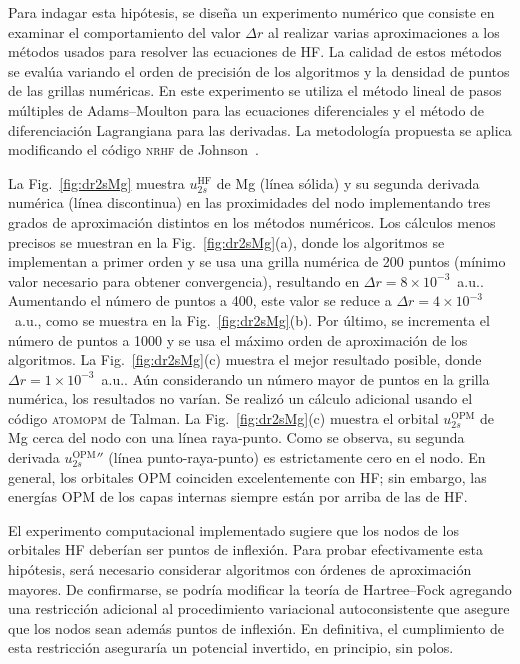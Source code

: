 Para indagar esta hipótesis, se diseña un experimento numérico que 
consiste en examinar el comportamiento del valor $\Delta r$ al realizar 
varias aproximaciones a los métodos usados para resolver las 
ecuaciones de HF. La calidad de estos métodos se evalúa variando el 
orden de precisión de los algoritmos y la densidad de puntos de las 
grillas numéricas. En este experimento se utiliza el método lineal de 
pasos múltiples de Adams--Moulton para las ecuaciones diferenciales y el 
método de diferenciación Lagrangiana para las derivadas. La metodología 
propuesta se aplica modificando el código \textsc{nrhf} de 
Johnson~\cite{Johnson:07}.

La Fig.~\ref{fig:dr2sMg} muestra $u_{2s}^{\mathrm{HF}}$ de Mg (línea 
sólida) y su segunda derivada numérica (línea discontinua) en las 
proximidades del nodo implementando tres grados de aproximación 
distintos en los métodos numéricos. Los cálculos menos precisos 
se muestran en la Fig.~\ref{fig:dr2sMg}(a), donde los algoritmos se 
implementan a primer orden y se usa una grilla numérica de 200 puntos 
(mínimo valor necesario para obtener convergencia), resultando en 
$\Delta r=8\times 10^{-3}$~a.u.. Aumentando el número de puntos a 400, 
este valor se reduce a $\Delta r=4\times 10^{-3}$~a.u., como se muestra 
en la Fig.~\ref{fig:dr2sMg}(b). Por último, se incrementa el número de 
puntos a 1000 y se usa el máximo orden de aproximación de los 
algoritmos. La Fig.~\ref{fig:dr2sMg}(c) muestra el mejor resultado 
posible, donde $\Delta r=1\times 10^{-3}$~a.u.. Aún considerando un 
número mayor de puntos en la grilla numérica, los resultados no varían. 
Se realizó un cálculo adicional usando el código \textsc{atomopm} de 
Talman. La Fig.~\ref{fig:dr2sMg}(c) muestra el orbital 
$u_{2s}^{\mathrm{OPM}}$ de Mg cerca del nodo con una línea raya-punto. 
Como se observa, su segunda derivada $u_{2s}^{\mathrm{OPM}}''$ (línea 
punto-raya-punto) es estrictamente cero en el nodo. En general, los 
orbitales OPM coinciden excelentemente con HF; sin embargo, las energías
OPM de los capas internas siempre están por arriba de las de HF.

El experimento computacional implementado sugiere que los nodos de los 
orbitales HF deberían ser puntos de inflexión. Para probar efectivamente 
esta hipótesis, será necesario considerar algoritmos con órdenes de 
aproximación mayores. De confirmarse, se podría modificar la teoría de 
Hartree--Fock agregando una restricción adicional al procedimiento 
variacional autoconsistente que asegure que los nodos sean además puntos 
de inflexión. En definitiva, el cumplimiento de esta restricción 
aseguraría un potencial invertido, en principio, sin polos. 

